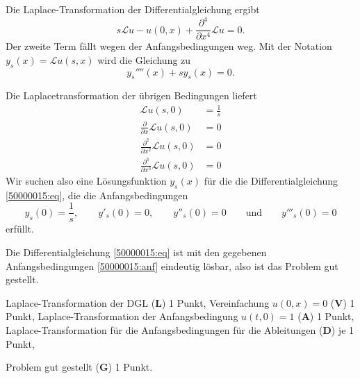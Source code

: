 \begin{loesung}
\begin{teilaufgaben}
\item
Die Laplace-Transformation der Differentialgleichung ergibt
\[
s{\mathcal{L}u} - u(0,x) + \frac{\partial^4}{\partial x^4}{\mathcal{L}u} = 0.
\]
Der zweite Term fällt wegen der Anfangsbedingungen weg.
Mit der Notation $y_s(x) = \mathcal{L}u(s,x)$ wird die Gleichung zu
\begin{equation}
y_s''''(x)+sy_s(x)=0.
\label{50000015:eq}
\end{equation}

Die Laplacetransformation der übrigen Bedingungen liefert
\begin{align*}
\mathcal{L} u(s,0)&=\frac1s
\\
\frac{\partial}{\partial x}\mathcal{L}u(s,0)&= 0\\
\frac{\partial^2}{\partial x^2}\mathcal{L}u(s,0)&= 0\\
\frac{\partial^3}{\partial x^3}\mathcal{L}u(s,0)&= 0
\end{align*}
Wir suchen also eine Lösungsfunktion $y_s(x)$ für die die Differentialgleichung
\eqref{50000015:eq}, die die Anfangsbedingungen
\begin{equation}
y_s(0)=\frac1s,\qquad
y'_s(0)=0,\qquad
y''_s(0)=0
\qquad\text{und}\qquad
y'''_s(0)=0
\label{50000015:anf}
\end{equation}
erfüllt.
\item
Die Differentialgleichung \eqref{50000015:eq} ist mit den gegebenen
Anfangsbedingungen \eqref{50000015:anf} eindeutig lösbar, also ist
das Problem gut gestellt.
\qedhere
\end{teilaufgaben}
\end{loesung}

\begin{bewertung}
\begin{teilaufgaben}
\item
Laplace-Transformation der DGL ({\bf L}) 1 Punkt,
Vereinfachung $u(0,x)=0$ ({\bf V}) 1 Punkt,
Laplace-Transformation der Anfangsbedingung $u(t,0)=1$ ({\bf A}) 1 Punkt,
Laplace-Transformation für die Anfangsbedingungen für die Ableitungen
({\bf D}) je 1 Punkt,
\item
Problem gut gestellt ({\bf G}) 1 Punkt.
\end{teilaufgaben}
\end{bewertung}
